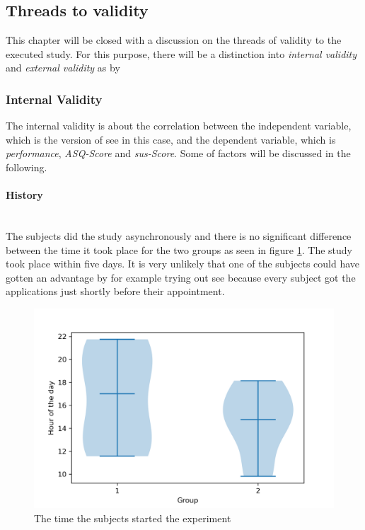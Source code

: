\subsection{Threads to validity}
\label{sec:validity}
This chapter will be closed with a discussion on the threads of validity to the executed study.
For this purpose, there will be a distinction into \textit{internal validity} and \textit{external validity} as by \cite{campbell2015experimental}

\subsubsection{Internal Validity}
The internal validity is about the correlation between the independent variable, which is the version of \gls{see} in this case, and the dependent variable, which is \textit{performance}, \textit{\gls{ASQ}-Score} and \textit{\gls{sus}-Score}.
Some of \cite{campbell2015experimental} factors will be discussed in the following.

\paragraph{History}\mbox{}\\
The subjects did the study asynchronously and there is no significant difference between the time it took place for the two groups as seen in figure \ref{fig:date_violin}.
The study took place within five days. 
It is very unlikely that one of the subjects could have gotten an advantage by for example trying out \gls{see} because every subject got the applications just shortly before their appointment.

\begin{figure}[htb]
  \centering
  \includegraphics*[width=1\textwidth]{Evaluation/img/_violin_time.png}
  \caption{The time the subjects started the experiment}
  \label{fig:date_violin}
\end{figure}

